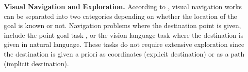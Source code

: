 
\textbf{Visual Navigation and Exploration.} %
According to \textcite{chaplot2020semantic}, visual navigation works can be separated into two categories depending on whether the location of the goal is known or not. Navigation problems where the destination point is given, include the point-goal task \cite{gupta2017cognitive, savva2017minos}, or the vision-language \cite{anderson2018vision} task where the destination is given in natural language. These tasks do not require extensive exploration since the destination is given a priori as coordinates (explicit destination) or as a path (implicit destination). 

